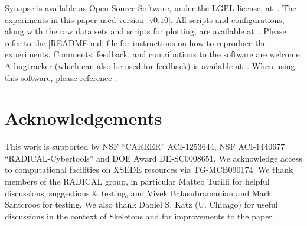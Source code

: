 \documentclass[10pt, conference, compsocconf]{IEEEtran}
\newcommand{\synapse}{Synapse\xspace}
\begin{document}
 \synapse is available as Open Source Software, under the LGPL license,
 at~\cite{synapse_url}.  The experiments in this paper used version
 |v0.10|.  All scripts and configurations, along with the raw data
 sets and scripts for plotting, are available at~\cite{synapse_exp}.
 Please refer to the |README.md| file for instructions on how to
 reproduce the experiments.  Comments, feedback, and contributions to
 the software are welcome.  A bugtracker (which can also be used for
 feedback) is available at~\cite{synapse_tracker}.  When using this
 software, please reference~\cite{synapse}.





\section*{Acknowledgements}

\footnotesize{This work is supported by NSF ``CAREER'' ACI-1253644, NSF
  ACI-1440677 ``RADICAL-Cybertools'' and DOE Award DE-SC0008651. We acknowledge
  access to computational facilities on XSEDE resources via TG-MCB090174. We
  thank members of the RADICAL group, in particular Matteo Turilli for helpful
  discussions, suggestions \& testing, and Vivek Balasubramanian and Mark
  Santcroos for testing. We also thank Daniel S. Katz (U. Chicago) for useful
  discussions in the context of Skeletons and for improvements to the paper.}







\end{document}
